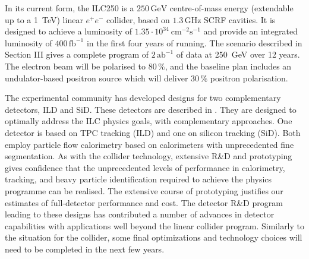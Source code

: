 In its current
form, the ILC250 is a $250\,{\mathrm{GeV}}$ centre-of-mass energy
(extendable up to a 1~TeV) linear $e^+e^-$ collider, based
on $1.3\,{\mathrm{GHz}}$ SCRF
cavities. It is designed to achieve a luminosity of $1.35\cdot
10^{34}~{\mathrm{cm}}^{-2}{\mathrm{s}}^{-1}$ and provide an integrated
luminosity of $400\,{\mathrm{fb}}^{-1}$ in the first four years of
running.  The scenario described in Section III gives a complete
program of $2\,{\mathrm{ab}}^{-1}$  of data at 250~GeV over 12 years.
The electron beam will be polarised to $80\,\%$, and the baseline plan includes an 
undulator-based
positron source which will  deliver
$30\,\%$ positron  polarisation. 


The experimental community has developed
designs for two complementary detectors, ILD and SiD.  These detectors
are described in 
 \cite{Behnke:2013lya}. They are designed to 
optimally address the
ILC physics goals, with complementary approaches. One detector is based on
TPC tracking (ILD) and one on silicon tracking (SiD).
Both employ particle flow calorimetry based on
calorimeters with unprecedented fine segmentation.
As with the collider technology, 
extensive R\&D and prototyping gives confidence that the
unprecedented levels of performance in calorimetry, tracking, and
heavy particle identification 
required to achieve the 
physics programme can be realised.
The  extensive course of
prototyping justifies our estimates of full-detector performance 
and cost.  
The detector R\&D program leading to these designs
has  contributed a number of advances in 
detector capabilities with applications well beyond the linear
collider program.    Similarly to the situation for the collider, some 
final optimizations and technology choices 
will need to be completed in the next few years. 

